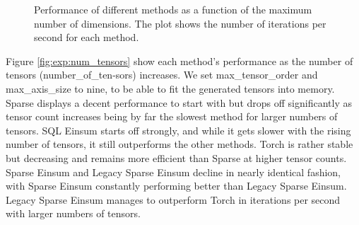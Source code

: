 \begin{figure}[H]
    \caption{Performance of different methods as a function of the maximum number of dimensions.
        The plot shows the number of iterations per second for each method.}
    \label{fig:exp:max_num_dim}
\end{figure}

\noindent
Figure \ref{fig:exp:num_tensors} show each method's performance as the number
of tensors (number\_of\_ten-sors) increases. We set max\_tensor\_order and max\_axis\_size to nine,
to be able to fit the generated tensors into memory. Sparse displays a decent performance to start with but
drops off significantly as tensor count increases being by far the slowest method for larger numbers of
tensors. SQL Einsum starts off strongly, and while it gets slower with the rising number of tensors, it
still outperforms the other methods. Torch is rather stable but decreasing and remains more efficient than
Sparse at higher tensor counts. Sparse Einsum and Legacy Sparse Einsum decline in nearly identical
fashion, with Sparse Einsum constantly performing better than Legacy Sparse Einsum. Legacy Sparse Einsum
manages to outperform Torch in iterations per second with larger numbers of tensors.

